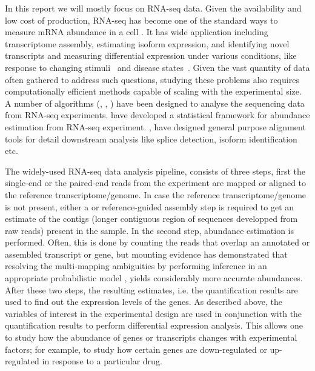 In this report we will mostly focus on RNA-seq data. Given the availability and low cost of production, RNA-seq has become one of the standard ways to measure mRNA abundance in a cell \citep{butte2000discovering}. It has wide application including \denovo transcriptome assembly, estimating isoform expression, and identifying novel transcripts and measuring differential expression under various conditions, like response to changing stimuli~\citep{Stubben2014} and disease states~\citep{diseaseDGE}.  Given the vast quantity of data often gathered to address such questions, studying these problems also requires computationally efficient methods capable of scaling with the experimental size. A number of algorithms (\citet{langmead2009ultrafast}, \citet{tophat}, \citet{mortazavi2008mapping}) have been designed to analyse the sequencing data from RNA-seq experiments. \citet{mortazavi2008mapping} have developed a statistical framework for abundance estimation from RNA-seq experiment. \citet{langmead2009ultrafast}, \citet{tophat} have  designed general purpose alignment tools for detail downstream analysis like splice detection, isoform identification etc.


The widely-used RNA-seq data analysis pipeline, consists of three steps, first the single-end or the paired-end reads from the experiment are mapped or aligned to the reference transcriptome/genome. In case the reference transcriptome/genome is not present, either a \denovo or reference-guided assembly step is required to get an estimate of the contigs (longer contiguous region of sequences developped from raw reads) present in the sample. In the second step, abundance estimation is performed. Often, this is done by counting the reads that overlap an annotated or assembled transcript or gene, but mounting evidence has demonstrated that resolving the multi-mapping ambiguities by performing inference in an appropriate probabilistic model \citep{pachter2011models}, yields considerably more accurate abundances. After these two steps, the resulting estimates, i.e. the quantification results are used to find out the expression levels of the genes.  As described above, the variables of interest in the experimental design are used in conjunction with the quantification results to perform differential expression analysis. This allows one to study how the abundance of genes or transcripts changes with experimental factors; for example, to study how certain genes are down-regulated or up-regulated in response to a particular drug. 

